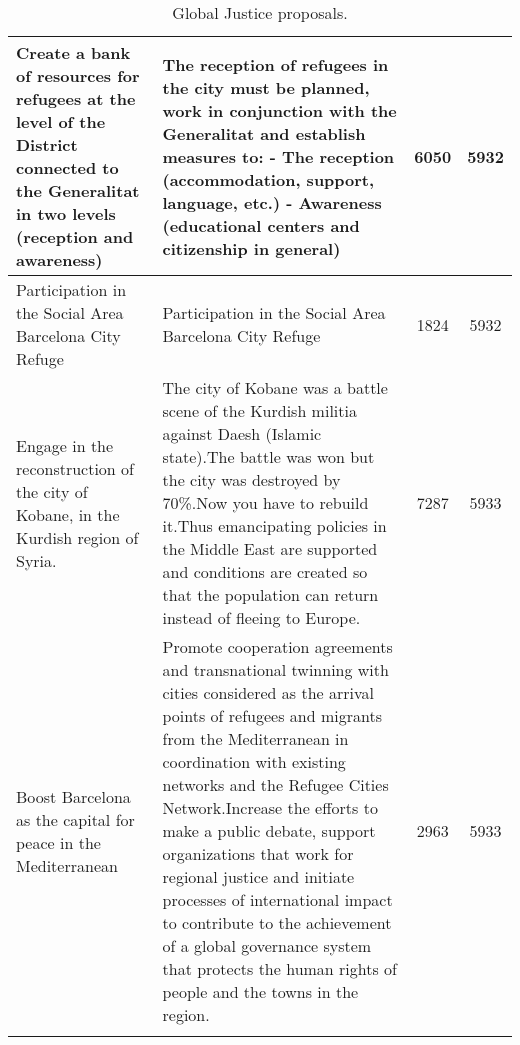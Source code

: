 \begin{spacing}{1}
\begin{longtable}{m{30mm}|m{90mm}|c @{\hskip 1mm} c}
 Create a bank of resources for refugees at the level of the District connected to the Generalitat in two levels (reception and awareness) & The reception of refugees in the city must be planned, work in conjunction with the Generalitat and establish measures to: - The reception (accommodation, support, language, etc.) - Awareness (educational centers and citizenship in general) & 6050 & 5932 \\ \hline
 Participation in the Social Area Barcelona City Refuge & Participation in the Social Area Barcelona City Refuge & 1824 & 5932 \\ \hline
 Engage in the reconstruction of the city of Kobane, in the Kurdish region of Syria. & The city of Kobane was a battle scene of the Kurdish militia against Daesh (Islamic state).The battle was won but the city was destroyed by 70\%.Now you have to rebuild it.Thus emancipating policies in the Middle East are supported and conditions are created so that the population can return instead of fleeing to Europe. & 7287 & 5933 \\ \hline
 Boost Barcelona as the capital for peace in the Mediterranean & Promote cooperation agreements and transnational twinning with cities considered as the arrival points of refugees and migrants from the Mediterranean in coordination with existing networks and the Refugee Cities Network.Increase the efforts to make a public debate, support organizations that work for regional justice and initiate processes of international impact to contribute to the achievement of a global governance system that protects the human rights of people and the towns in the region. & 2963 & 5933 \\ \hline
\caption{Global Justice proposals.}
\label{tab:negatives} \\
\end{longtable}
\end{spacing}
\normalsize